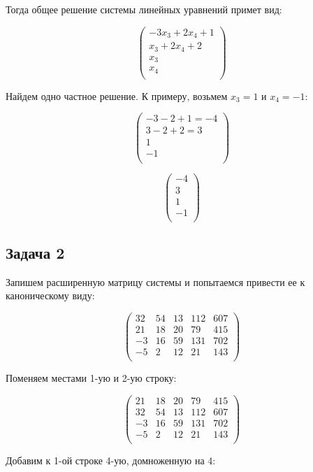 	Тогда общее решение системы линейных уравнений примет вид:
	
	\[
	\begin{pmatrix}
		-3x_3 + 2x_4 + 1 \\
		x_3 + 2x_4 +2 \\
		x_3 \\
		x_4 \\
	\end{pmatrix}
	\]
	
	Найдем одно частное решение. К примеру, возьмем $x_3 = 1$ и $x_4 = -1$:
	
	\[
		\begin{pmatrix}
		-3 - 2 + 1 = -4 \\
		3 - 2 + 2 = 3 \\
		1 \\
		-1 \\
		\end{pmatrix}
	\]
		
	\[
		\begin{pmatrix}
		-4 \\
		3 \\
		1 \\
		-1 \\
	\end{pmatrix}
	\]
	
	\subsection{Задача 2} 
	Запишем расширенную матрицу системы и попытаемся привести ее к каноническому виду:
	
	\[
	\begin{pmatrix}
	32 & 54 & 13 & 112 & 607 \\
	21 & 18 & 20 & 79 & 415 \\
	-3 & 16 & 59 & 131 & 702 \\
	-5 & 2 & 12 & 21 & 143 \\
	\end{pmatrix}
	\]
	
	Поменяем местами 1-ую и 2-ую строку:
	
	\[
	\begin{pmatrix}
	21 & 18 & 20 & 79 & 415 \\
	32 & 54 & 13 & 112 & 607 \\
	-3 & 16 & 59 & 131 & 702 \\
	-5 & 2 & 12 & 21 & 143 \\
	\end{pmatrix}
	\]
	
	Добавим к 1-ой строке 4-ую, домноженную на 4:
	
